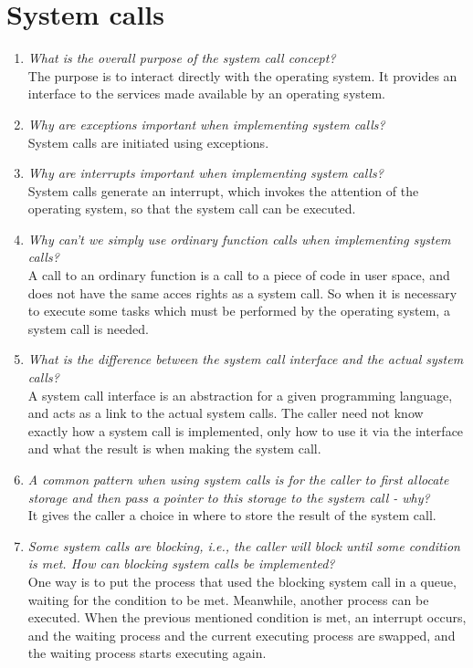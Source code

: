 \documentclass[a4paper]{article}
\begin{document}
\section{System calls}
\begin{enumerate}
  \item \textit{What is the overall purpose of the system call concept? } \\
    The purpose is to interact directly with the operating system. It provides an interface to the services made available by an operating system.
  \item \textit{Why are exceptions important when implementing system calls?} \\
    System calls are initiated using exceptions. 
  \item \textit{Why are interrupts important when implementing system calls?} \\
    System calls generate an interrupt, which invokes the attention of the operating system, so that the system call can be executed.
  \item \textit{Why can't we simply use ordinary function calls when implementing system calls?} \\
    A call to an ordinary function is a call to a piece of code in user space, and does not have the same acces rights as a system call. So when it is necessary to execute some tasks which must be performed by the operating system, a system call is needed.
  \item \textit{What is the difference between the system call interface and the actual system calls?} \\
    A system call interface is an abstraction for a given programming language, and acts as a link to the actual system calls. The caller need not know exactly how a system call is implemented, only how to use it via the interface and what the result is when making the system call.
  \item \textit{A common pattern when using system calls is for the caller to first allocate storage and then pass a pointer to this storage to the system call - why? } \\ 
    It gives the caller a choice in where to store the result of the system call.
  \item \textit{Some system calls are blocking, i.e., the caller will block until some condition is met. How can blocking system calls be implemented?} \\
   One way is to put the process that used the blocking system call in a queue, waiting for the condition to be met. Meanwhile, another process can be executed. When the previous mentioned condition is met, an interrupt occurs, and the waiting process and the current executing process are swapped, and the waiting process starts executing again. 
  
\end{enumerate}
\end{document}
